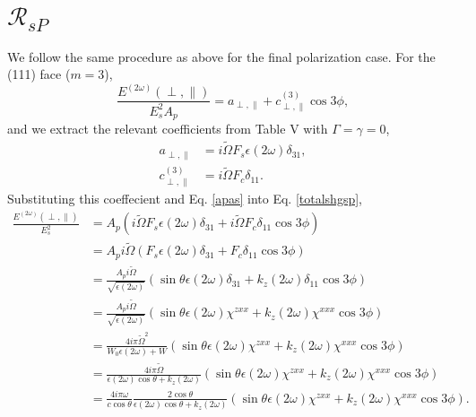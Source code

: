 \section{\texorpdfstring{$\mathcal{R}_{sP}$}{RsP}}
We follow the same procedure as above for the final polarization case. For the
(111) face ($m = 3$),
\begin{equation}\label{totalshgsp} %
\frac{E^{(2\omega)}(\perp,\parallel)}{E^{2}_{s}A_{p}}
    = a_{\perp,\parallel} + c^{(3)}_{\perp,\parallel}\cos3\phi,
\end{equation}
and we extract the relevant coefficients from Table V with $\Gamma=\gamma=0$,
\begin{align*}
a_{\perp,\parallel} &= i\tilde{\Omega}F_{s}\epsilon(2\omega)\delta_{31},\\
c^{(3)}_{\perp,\parallel} &= i\tilde{\Omega}F_{c}\delta_{11}.
\end{align*}
Substituting this coeffecient and Eq. \eqref{apas} into Eq. \eqref{totalshgsp},
\begin{equation*}
\begin{split}
\frac{E^{(2\omega)}(\perp,\parallel)}{E^{2}_{s}}
&= A_{p}(i\tilde{\Omega}F_{s}\epsilon(2\omega)\delta_{31}
    + i\tilde{\Omega}F_{c}\delta_{11}\cos3\phi)\\
&= A_{p}i\tilde{\Omega}(F_{s}\epsilon(2\omega)\delta_{31}
    + F_{c}\delta_{11}\cos3\phi)\\
&= \frac{A_{p}i\tilde{\Omega}}{\sqrt{\epsilon(2\omega)}}
   (
   \sin\theta\epsilon(2\omega)\delta_{31} + k_{z}(2\omega)\delta_{11}\cos3\phi
   )\\
&= \frac{A_{p}i\tilde{\Omega}}{\sqrt{\epsilon(2\omega)}}
   (
   \sin\theta\epsilon(2\omega)\chi^{zxx} + k_{z}(2\omega)\chi^{xxx}\cos3\phi
   )\\
&= \frac{4i\pi\tilde{\Omega}^{2}}{W_{0}\epsilon(2\omega) + W}
   (
   \sin\theta\epsilon(2\omega)\chi^{zxx} + k_{z}(2\omega)\chi^{xxx}\cos3\phi
   )\\
&= \frac{4i\pi\tilde{\Omega}}{\epsilon(2\omega)\cos\theta + k_{z}(2\omega)}
   (
   \sin\theta\epsilon(2\omega)\chi^{zxx} + k_{z}(2\omega)\chi^{xxx}\cos3\phi
   )\\
&= \frac{4i\pi\omega}{c\cos\theta}
   \frac{2\cos\theta}{\epsilon(2\omega)\cos\theta + k_{z}(2\omega)}
   (\sin\theta\epsilon(2\omega)\chi^{zxx} + k_{z}(2\omega)\chi^{xxx}\cos3\phi).
\end{split}
\end{equation*}

